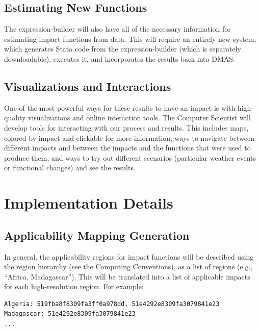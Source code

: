 \documentclass[12pt, oneside]{amsart}
\begin{document}
\subsection{Estimating New Functions}
\label{sec:estimation}

The expression-builder will also have all of the necessary information
for estimating impact functions from data.  This will require an
entirely new system, which generates Stata code from the
expression-builder (which is separately downloadable), executes it,
and incorporates the results back into DMAS.

\subsection{Visualizations and Interactions}
\label{sec:visualinteract}

One of the most powerful ways for these results to have an impact is
with high-quality visualizations and online interaction tools.  The
Computer Scientist will develop tools for interacting with our process
and results.  This includes maps, colored by impact and clickable for
more information; ways to navigate between different impacts and
between the impacts and the functions that were used to produce them;
and ways to try out different scenarios (particular weather events or
functional changes) and see the results.

\section{Implementation Details}

\subsection{Applicability Mapping Generation}
\label{sec:appmapgen}

In general, the applicability regions for impact functions will be
described using the region hierarchy (see the Computing Conventions),
as a list of regions (e.g., ``Africa, Madagascar'').  This will be
translated into a list of applicable impacts for each high-resolution
region.  For example:

\begin{verbatim}
Algeria: 519fba8f8309fa3ff0a978dd, 51e4292e8309fa3079841e23
Madagascar: 51e4292e8309fa3079841e23
...
\end{verbatim}
\end{document}
